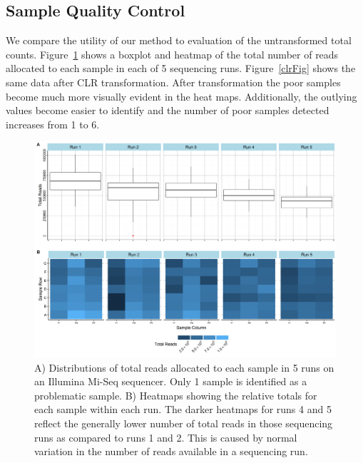 \documentclass{article}\usepackage[]{graphicx}\usepackage[]{color}
\theoremstyle{definition}
\begin{document}
\subsection{Sample Quality Control}

We compare the utility of our method to evaluation of the untransformed total counts.  Figure~\ref{totalFig} shows a boxplot and heatmap of the total number of reads allocated to each sample in each of 5 sequencing runs.  Figure~\ref{clrFig} shows the same data after CLR transformation.  After transformation the poor samples become much more visually evident in the heat maps.  Additionally, the outlying values become easier to identify and the number of poor samples detected increases from 1 to 6.  \\

\begin{figure}
\includegraphics[scale=.5]{./Figures/IO_Repro_Combined_RawTotals}
\caption{A) Distributions of total reads allocated to each sample in 5 runs on an Illumina Mi-Seq sequencer. Only 1 sample is identified as a problematic sample. B) Heatmaps showing the relative totals for each sample within each run.  The darker heatmaps for runs 4 and 5 reflect the generally lower number of total reads in those sequencing runs as compared to runs 1 and 2.  This is caused by normal variation in the number of reads available in a sequencing run.}
\label{totalFig}
\end{figure}
 
\end{document}
